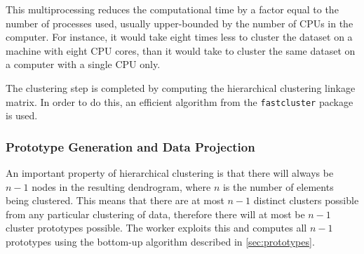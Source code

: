 \documentclass[parskip]{cs4rep}
\newcommand{\pythonpackage}[1]{{\tt #1}}
\begin{document}
This multiprocessing reduces the computational time by a factor equal to the number of processes used, usually upper-bounded by the number of CPUs in the computer. For instance, it would take eight times less to cluster the dataset on a machine with eight CPU cores, than it would take to cluster the same 
dataset on a computer with a single CPU only. 

The clustering step is completed by computing the hierarchical clustering linkage matrix. In order to do this, an efficient 
algorithm from the \pythonpackage{fastcluster} package is used.

\subsubsection{Prototype Generation and Data Projection}

An important property of hierarchical clustering is that there will always be $n-1$ nodes in the resulting dendrogram, where $n$ is the number of elements being clustered. This means that there are at most $n-1$ distinct clusters possible from any particular clustering of data, therefore there will at most be $n-1$ cluster prototypes possible. The worker exploits this and computes all $n-1$ prototypes using the bottom-up algorithm described in \autoref{sec:prototypes}. 
\end{document}
